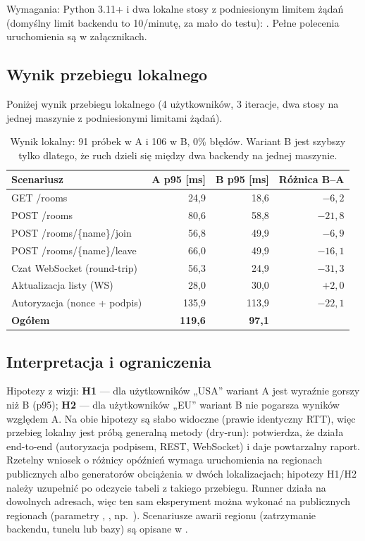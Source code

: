 Wymagania: Python 3.11+ i dwa lokalne stosy z podniesionym limitem żądań (domyślny limit backendu to
10/minutę, za mało do testu): . Pełne polecenia
uruchomienia są w załącznikach.

\subsection{Wynik przebiegu lokalnego}
Poniżej wynik przebiegu lokalnego (4 użytkowników, 3 iteracje, dwa stosy na jednej maszynie z podniesionymi
limitami żądań).

\begin{table}[H]
\centering\footnotesize
\begin{tabular}{@{}lrrr@{}}
\toprule
\textbf{Scenariusz} & \textbf{A p95 [ms]} & \textbf{B p95 [ms]} & \textbf{Różnica B--A} \\
\midrule
GET /rooms & 24,9 & 18,6 & $-6{,}2$ \\
POST /rooms & 80,6 & 58,8 & $-21{,}8$ \\
POST /rooms/\{name\}/join & 56,8 & 49,9 & $-6{,}9$ \\
POST /rooms/\{name\}/leave & 66,0 & 49,9 & $-16{,}1$ \\
Czat WebSocket (round-trip) & 56,3 & 24,9 & $-31{,}3$ \\
Aktualizacja listy (WS) & 28,0 & 30,0 & $+2{,}0$ \\
Autoryzacja (nonce + podpis) & 135,9 & 113,9 & $-22{,}1$ \\
\midrule
\textbf{Ogółem} & \textbf{119,6} & \textbf{97,1} & \\
\bottomrule
\end{tabular}
\caption{Wynik lokalny: 91 próbek w A i 106 w B, 0\% błędów. Wariant B jest szybszy tylko dlatego, że ruch
dzieli się między dwa backendy na jednej maszynie.}
\end{table}

\subsection{Interpretacja i ograniczenia}
Hipotezy z wizji: \textbf{H1} --- dla użytkowników „USA'' wariant A jest wyraźnie gorszy niż B (p95);
\textbf{H2} --- dla użytkowników „EU'' wariant B nie pogarsza wyników względem A. Na  obie
hipotezy są słabo widoczne (prawie identyczny RTT), więc przebieg lokalny jest próbą generalną metody (dry-run):
potwierdza, że działa end-to-end (autoryzacja podpisem, REST, WebSocket) i daje powtarzalny raport. Rzetelny
wniosek o różnicy opóźnień wymaga uruchomienia na regionach publicznych albo generatorów obciążenia w dwóch
lokalizacjach; hipotezy H1/H2 należy uzupełnić po odczycie tabeli z takiego przebiegu. Runner działa na
dowolnych adresach, więc ten sam eksperyment można wykonać na publicznych regionach (parametry ,
, np.\ ). Scenariusze awarii regionu (zatrzymanie backendu, tunelu lub bazy)
są opisane w .

